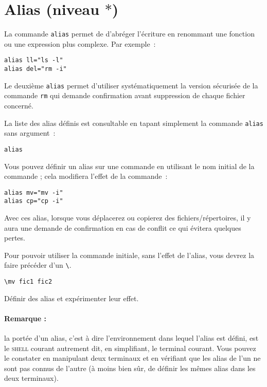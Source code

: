 \documentclass[a4paper,11pt]{article}
\newcommand{\shell}{\textsc{shell}}
\begin{document}
\section{Alias %
(niveau $*$)}
\label{alias_bash}

La commande \texttt{alias} permet de d'abréger l'écriture
en renommant une fonction ou une expression plus complexe. Par
exemple :
\begin{verbatim}
alias ll="ls -l"
alias del="rm -i"
\end{verbatim} 

Le deuxième \texttt{alias} permet d'utiliser systématiquement la
version sécurisée de la commande \texttt{rm} qui demande confirmation
avant suppression de chaque fichier concerné.

La liste des alias définis est consultable en tapant simplement la
commande \texttt{alias} sans argument :
\begin{verbatim}
alias
\end{verbatim}

Vous pouvez définir un alias sur une commande en utilisant le nom initial de
la commande ; cela modifiera l'effet de la commande~:

\begin{verbatim}
alias mv="mv -i"
alias cp="cp -i"
\end{verbatim} 

Avec ces alias, lorsque vous déplacerez ou copierez des fichiers/répertoires,
il y aura une demande de confirmation en cas de conflit ce qui évitera
quelques pertes.

Pour pouvoir utiliser la commande initiale, sans l'effet de l'alias, vous
devrez la faire précéder d'un \verb+\+.

\begin{verbatim}
\mv fic1 fic2
\end{verbatim}

\begin{maw}
Définir des alias et expérimenter leur effet.
\end{maw}

\paragraph{Remarque :} la portée d'un alias, c'est à dire l'environnement dans
lequel l'alias est défini, est le \shell{} courant autrement dit, en
simplifiant, le terminal courant.
Vous pouvez le constater en manipulant deux terminaux et
en vérifiant que les alias de l'un ne sont pas connus de l'autre (à moins
bien sûr, de définir les mêmes alias dans les deux terminaux).
\end{document}
